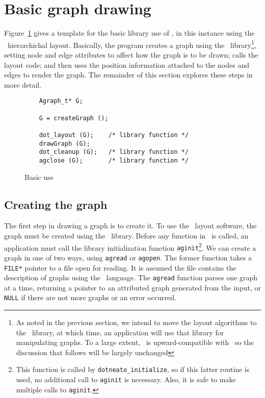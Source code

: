 \section{Basic graph drawing}
Figure~\ref{fig:basic} gives a template for the basic library use of \gviz,
in this instance using the \dot\ hierarchichal layout.
Basically, the program creates a graph using the \graph\
library\footnote{As noted in the previous section, we intend to move
the layout algorithms to the \agraph\ library, at which time, an 
application will use that library for manipulating graphs. To a large
extent, \agraph\ is upward-compatible with \graph\, so the discussion
that follows will be largely unchanged}, setting node and edge 
attributes to affect how the graph is
to be drawn; calls the layout code; and then uses the position information
attached to the nodes and edges to render the graph. The remainder of
this section explores these steps in more detail.

\begin{figure}[hbt]
\begin{verbatim}
    Agraph_t* G;

    G = createGraph ();

    dot_layout (G);    /* library function */
    drawGraph (G);
    dot_cleanup (G);   /* library function */
    agclose (G);       /* library function */
\end{verbatim}
\caption{Basic use}
\label{fig:basic}
\end{figure}

\subsection{Creating the graph}
The first step in drawing a graph is to create it. To use the \gviz\
layout software, the graph must be created using the \graph\ library. 
Before any function in \graph\ is called, an application must
call the library initialization function {\tt aginit}\footnote{This
function is called by {\tt dotneato\_initialize}, so if this latter routine
is used, no additional call to {\tt aginit} is necessary.
Also, it is safe to make multiple calls to {\tt aginit}.}.
We can create a graph in one of two ways, using {\tt agread} or {\tt agopen}.
The former function takes a {\tt FILE*} pointer to a file open for reading.
It is assumed the file contains the description of graphs using the
\DOT\ language. The {\tt agread} function parses one graph at a time, 
returning a pointer to an attributed graph generated from the input,
or {\tt NULL} if there are not more graphs or an error occurred.


